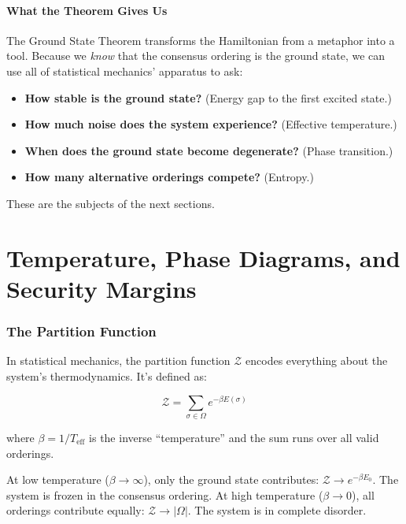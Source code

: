 \documentclass[11pt,a4paper]{article}
\begin{document}
\subsection{What the Theorem Gives Us}

The Ground State Theorem transforms the Hamiltonian from a metaphor into a tool. Because we \emph{know} that the consensus ordering is the ground state, we can use all of statistical mechanics' apparatus to ask:

\begin{itemize}
    \item \textbf{How stable is the ground state?} (Energy gap to the first excited state.)
    \item \textbf{How much noise does the system experience?} (Effective temperature.)
    \item \textbf{When does the ground state become degenerate?} (Phase transition.)
    \item \textbf{How many alternative orderings compete?} (Entropy.)
\end{itemize}

These are the subjects of the next sections.

\part{Temperature, Phase Diagrams, and Security Margins}

\section{The Partition Function}

In statistical mechanics, the partition function $\mathcal{Z}$ encodes everything about the system's thermodynamics. It's defined as:

\begin{equation}
\mathcal{Z} = \sum_{\sigma \in \Omega} e^{-\beta E(\sigma)}
\end{equation}

where $\beta = 1/T_{\text{eff}}$ is the inverse ``temperature'' and the sum runs over all valid orderings.

At low temperature ($\beta \to \infty$), only the ground state contributes: $\mathcal{Z} \to e^{-\beta E_0}$. The system is frozen in the consensus ordering. At high temperature ($\beta \to 0$), all orderings contribute equally: $\mathcal{Z} \to |\Omega|$. The system is in complete disorder.
\end{document}
